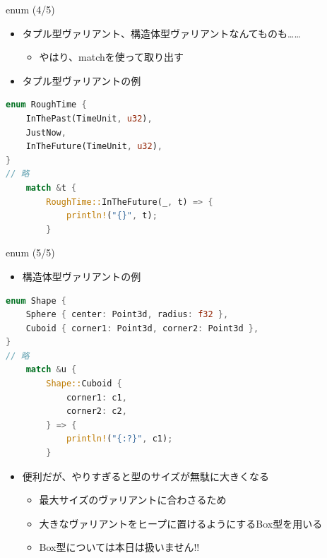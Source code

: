 \documentclass[cjk,dvipdfmx,10pt,compress,fragile%
hyperref={bookmarks=true,bookmarksnumbered=true,bookmarksopen=false,%
colorlinks=false,%
pdftitle={第 134 回 関西 Debian 勉強会},%
pdfauthor={小林},%
pdfsubject={資料},%
}]{beamer}
\begin{document}
\begin{frame}[t,fragile]{enum (4/5)}
 \begin{itemize}
  \item タプル型ヴァリアント、構造体型ヴァリアントなんてものも……
	\begin{itemize}
	 \item やはり、matchを使って取り出す
	\end{itemize}
  \item タプル型ヴァリアントの例
 \end{itemize}
\begin{lstlisting}[language=Rust,style=boxed,style=colouredRust,basicstyle=\small\tt,lineskip=-2pt]
enum RoughTime {
    InThePast(TimeUnit, u32),
    JustNow,
    InTheFuture(TimeUnit, u32),
}
// 略
    match &t {
        RoughTime::InTheFuture(_, t) => {
            println!("{}", t);
        }\end{lstlisting}
\end{frame}

\begin{frame}[t,fragile]{enum (5/5)}
\begin{itemize}
 \item 構造体型ヴァリアントの例
\end{itemize}
\begin{lstlisting}[language=Rust,style=boxed,style=colouredRust,basicstyle=\small\tt,lineskip=-2pt]
enum Shape {
    Sphere { center: Point3d, radius: f32 },
    Cuboid { corner1: Point3d, corner2: Point3d },
}
// 略
    match &u {
        Shape::Cuboid {
            corner1: c1,
            corner2: c2,
        } => {
            println!("{:?}", c1);
        }\end{lstlisting}
 \begin{itemize}
  \item 便利だが、やりすぎると型のサイズが無駄に大きくなる
	\begin{itemize}
	 \item 最大サイズのヴァリアントに合わさるため
	 \item 大きなヴァリアントをヒープに置けるようにするBox型を用いる
	 \item Box型については本日は扱いません!!
	\end{itemize}
 \end{itemize}
\end{frame}
\end{document}
